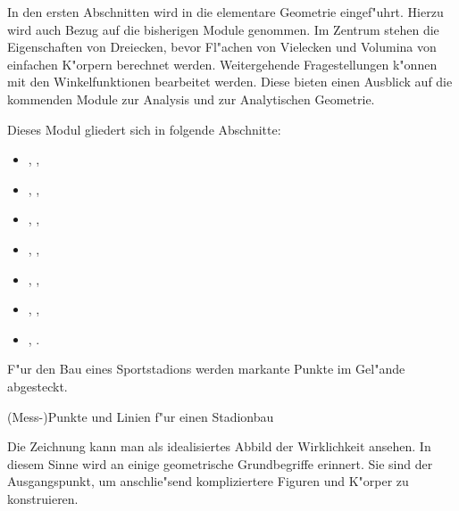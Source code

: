

\Mtikzexternalize

\MSetSubject{\MINTMathematics}




\begin{MSectionStart}

In den ersten Abschnitten wird in die elementare Geometrie eingef"uhrt. 
Hierzu wird auch Bezug auf die bisherigen Module genommen. Im Zentrum stehen 
die Eigenschaften von Dreiecken, bevor Fl"achen von Vielecken und Volumina 
von einfachen K"orpern berechnet werden.
Weitergehende Fragestellungen k"onnen mit den Winkelfunktionen bearbeitet
werden. Diese bieten einen Ausblick auf die kommenden Module zur Analysis
und zur Analytischen Geometrie.

Dieses Modul gliedert sich in folgende Abschnitte:

\begin{itemize}
\item{, ,}
\item{, ,}
\item{, ,}
\item{, ,}
\item{, ,}
\item{, ,}
\item{, .}
\end{itemize}

\end{MSectionStart}



\begin{MIntro}

F"ur den Bau eines Sportstadions werden markante Punkte im Gel"ande abgesteckt.


\begin{center}
(Mess-)Punkte und Linien f"ur einen Stadionbau
\end{center}

Die Zeichnung kann man als idealisiertes Abbild der Wirklichkeit ansehen.
In diesem Sinne wird an einige geometrische Grundbegriffe erinnert. Sie sind 
der Ausgangspunkt, um anschlie"send kompliziertere Figuren und K"orper zu 
konstruieren.
\end{MIntro}

